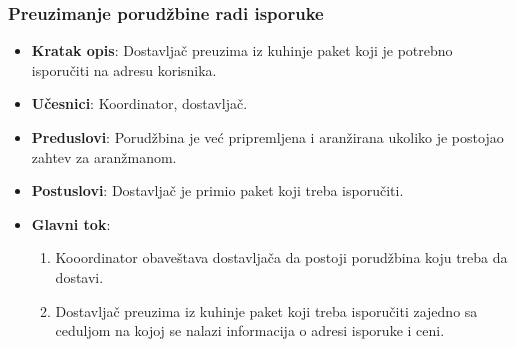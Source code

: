 \subsubsection{Preuzimanje porudžbine radi isporuke}
\begin{itemize}
    \item \textbf{Kratak opis}:
    Dostavljač preuzima iz kuhinje paket koji je potrebno isporučiti na adresu korisnika.
    \item \textbf{Učesnici}: 
    Koordinator, dostavljač.
    \item \textbf{Preduslovi}:
    Porudžbina je već pripremljena i aranžirana ukoliko je postojao zahtev za aranžmanom.
    \item \textbf{Postuslovi}:
    Dostavljač je primio paket koji treba isporučiti.
    \item \textbf{Glavni tok}:
   \begin{enumerate}
        \item Kooordinator obaveštava
        dostavljača da postoji porudžbina koju 
        treba da dostavi.
        \item Dostavljač preuzima iz kuhinje paket koji treba isporučiti zajedno sa ceduljom na kojoj se nalazi informacija o adresi isporuke i ceni.
\end{enumerate}
\end{itemize}

